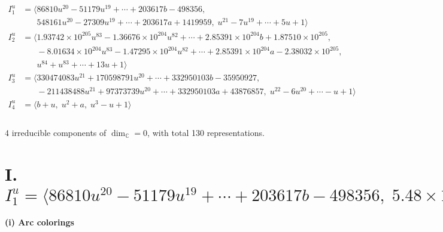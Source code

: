 \documentclass[1p]{elsarticle_modified}
\theoremstyle{definition}
\begin{document}
\begin{align*}
I^u_{1}&=\langle 
86810 u^{20}-51179 u^{19}+\cdots+203617 b-498356,\\
\phantom{I^u_{1}}&\phantom{= \langle  }548161 u^{20}-27309 u^{19}+\cdots+203617 a+1419959,\;u^{21}-7 u^{19}+\cdots+5 u+1\rangle \\
I^u_{2}&=\langle 
1.93742\times10^{205} u^{83}-1.36676\times10^{204} u^{82}+\cdots+2.85391\times10^{204} b+1.87510\times10^{205},\\
\phantom{I^u_{2}}&\phantom{= \langle  }-8.01634\times10^{204} u^{83}-1.47295\times10^{204} u^{82}+\cdots+2.85391\times10^{204} a-2.38032\times10^{205},\\
\phantom{I^u_{2}}&\phantom{= \langle  }u^{84}+u^{83}+\cdots+13 u+1\rangle \\
I^u_{3}&=\langle 
330474083 u^{21}+170598791 u^{20}+\cdots+332950103 b-35950927,\\
\phantom{I^u_{3}}&\phantom{= \langle  }-211438488 u^{21}+97373739 u^{20}+\cdots+332950103 a+43876857,\;u^{22}-6 u^{20}+\cdots- u+1\rangle \\
I^u_{4}&=\langle 
b+u,\;u^2+a,\;u^3- u+1\rangle \\
\\
\end{align*}
\raggedright * 4 irreducible components of $\dim_{\mathbb{C}}=0$, with total 130 representations.\\
\newpage
\renewcommand{\arraystretch}{1}
\centering \section*{I. $I^u_{1}= \langle 86810 u^{20}-51179 u^{19}+\cdots+203617 b-498356,\;5.48\times10^{5} u^{20}-2.73\times10^{4} u^{19}+\cdots+2.04\times10^{5} a+1.42\times10^{6},\;u^{21}-7 u^{19}+\cdots+5 u+1 \rangle$}
\flushleft \textbf{(i) Arc colorings}\\
\end{document}
